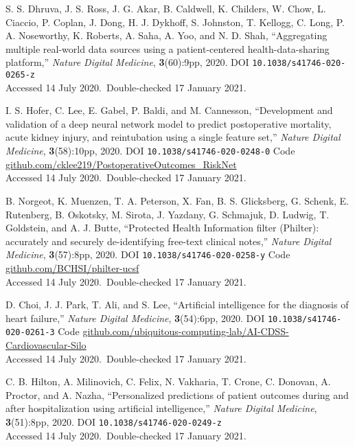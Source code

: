 \vbox{
{\sc S. S. Dhruva, J. S. Ross, J. G. Akar, B. Caldwell, K. Childers, W. Chow, L. Ciaccio, P. Coplan, J. Dong, H. J. Dykhoff, S. Johnston, T. Kellogg, C. Long, P. A. Noseworthy, K. Roberts, A. Saha, A. Yoo, and N. D. Shah}, ``Aggregating multiple real-world data sources using a patient-centered health-data-sharing platform,'' \emph{Nature Digital Medicine}, \textbf{3}(60):9pp, 2020. DOI \texttt{10.1038/s41746-020-0265-z}\\\hfill{Accessed 14 July 2020.}\ {Double-checked 17 January 2021}.}\bibskip

\vbox{
{\sc I. S. Hofer, C. Lee, E. Gabel, P. Baldi, and M. Cannesson}, ``Development and validation of a deep neural network model to predict postoperative mortality, acute kidney injury, and reintubation using a single feature set,'' \emph{Nature Digital Medicine}, \textbf{3}(58):10pp, 2020. DOI \texttt{10.1038/s41746-020-0248-0} {Code \url{github.com/cklee219/PostoperativeOutcomes_RiskNet}}\\\hfill{Accessed 14 July 2020.}\ {Double-checked 17 January 2021}.}\bibskip

\vbox{
{\sc B. Norgeot, K. Muenzen, T. A. Peterson, X. Fan, B. S. Glicksberg, G. Schenk, E. Rutenberg, B. Oskotsky, M. Sirota, J. Yazdany, G. Schmajuk, D. Ludwig, T. Goldstein, and A. J. Butte}, ``Protected Health Information filter (Philter): accurately and securely de-identifying free-text clinical notes,'' \emph{Nature Digital Medicine}, \textbf{3}(57):8pp, 2020. DOI \texttt{10.1038/s41746-020-0258-y} {Code \url{github.com/BCHSI/philter-ucsf}}\\\hfill{Accessed 14 July 2020.}\ {Double-checked 17 January 2021}.}\bibskip

\vbox{
{\sc D. Choi, J. J. Park, T. Ali, and S. Lee}, ``Artificial intelligence for the diagnosis of heart failure,'' \emph{Nature Digital Medicine}, \textbf{3}(54):6pp, 2020. DOI \texttt{10.1038/s41746-020-0261-3} {Code \url{github.com/ubiquitous-computing-lab/AI-CDSS-Cardiovascular-Silo}}\\\hfill{Accessed 14 July 2020.}\ {Double-checked 17 January 2021}.}\bibskip

\vbox{
{\sc C. B. Hilton, A. Milinovich, C. Felix, N. Vakharia, T. Crone, C. Donovan, A. Proctor, and A. Nazha}, ``Personalized predictions of patient outcomes during and after hospitalization using artificial intelligence,'' \emph{Nature Digital Medicine}, \textbf{3}(51):8pp, 2020. DOI \texttt{10.1038/s41746-020-0249-z}\\\hfill{Accessed 14 July 2020.}\ {Double-checked 17 January 2021}.}\bibskip

